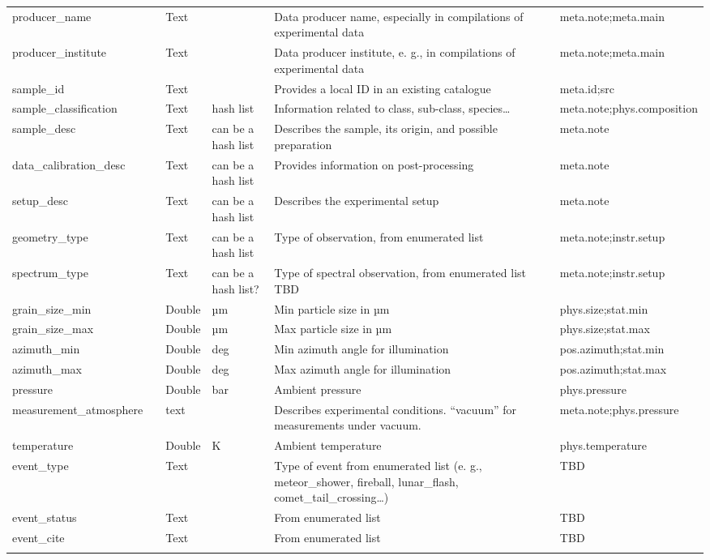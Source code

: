 \documentclass[11pt,a4paper]{ivoa}
\begin{document}
\begin{longtable}{p{3.5cm}p{0.5cm}p{1cm}p{1cm}p{7cm}p{3cm}}
producer\_name&&Text&&Data producer name, especially in compilations of experimental data&meta.note;meta.main\\
producer\_institute&&Text&&Data producer institute, e. g., in compilations of experimental data&meta.note;meta.main\\
sample\_id&&Text&&Provides a local ID in an existing catalogue &meta.id;src\\
sample\_classification&&Text&hash list&Information related to class, sub-class, species… &meta.note;phys.composition\\
sample\_desc&&Text&can be a hash list&Describes the sample, its origin, and possible preparation&meta.note\\
data\_calibration\_desc&&Text&can be a hash list&Provides information on post-processing &meta.note\\
setup\_desc&&Text&can be a hash list&Describes the experimental setup &meta.note\\
geometry\_type&&Text&can be a hash list&Type of observation, from enumerated list&meta.note;instr.setup\\
spectrum\_type&&Text&can be a hash list?&Type of spectral observation, from enumerated list TBD&meta.note;instr.setup\\
grain\_size\_min&&Double&µm&Min particle size in µm&phys.size;stat.min\\
grain\_size\_max&&Double&µm&Max particle size in µm&phys.size;stat.max\\
azimuth\_min&&Double&deg&Min azimuth angle for illumination&pos.azimuth;stat.min\\
azimuth\_max&&Double&deg&Max azimuth angle for illumination&pos.azimuth;stat.max\\
pressure&&Double&bar&Ambient pressure&phys.pressure\\
measurement\_atmosphere&&text&&Describes experimental conditions. ``vacuum'' for measurements under vacuum.&meta.note;phys.pressure\\
temperature&&Double&K&Ambient temperature&phys.temperature\\
event\_type&&Text&&Type of event from enumerated list (e. g., meteor\_shower, fireball, lunar\_flash, comet\_tail\_crossing…)&TBD\\
event\_status&&Text&&From enumerated list&TBD\\
event\_cite&&Text&&From enumerated list&TBD\\
\sptablerule
\end{longtable}
\endgroup
\end{document}
